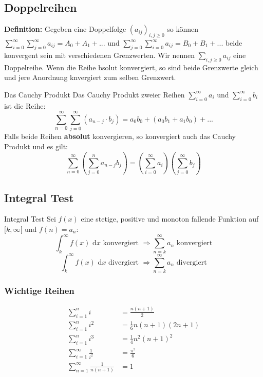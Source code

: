 \documentclass[a4paper,8pt]{extarticle}
\newenvironment{definition}{
   \noindent \textbf{Definition:  }}{}
\def\dx{\text{ d}x}
\begin{document}
\subsection{Doppelreihen}

\begin{definition}
  Gegeben eine Doppelfolge $(a_{ij})_{i,j \geq 0}$ so können \\ $\sum_{i=0}^\infty \sum_{j=0}^\infty a_{ij} = A_0 + A_1 + ...$ und $\sum_{j=0}^\infty \sum_{i=0}^\infty a_{ij} = B_0 + B_1 + ...$ beide konvergent sein mit verschiedenen Grenzwerten. Wir nennen $\sum_{i, j \geq 0} a_{ij}$ eine Doppelreihe. Wenn die Reihe bsolut konvergiert, so sind beide Grenzwerte gleich und jere Anordnung knvergiert zum selben Grenzwert.
\end{definition}

\begin{mainbox}{Das Cauchy Produkt}
  Das Cauchy Produkt zweier Reihen $\sum_{i=0}^{\infty} a_i$ und $\sum_{i=0}^{\infty} b_i$ ist die Reihe: 
  $$\sum_{n=0}^{\infty} \sum_{j=0}^\infty (a_{n-j} \cdot b_j) = a_0 b_0 + (a_0 b_1 + a_1 b_0) + ...$$
  Falls beide Reihen \textbf{absolut} konvergieren, so konvergiert auch das Cauchy Produkt und es gilt:
  $$\sum_{n=0}^\infty \left(\sum_{j=0}^n a_{n-j}b_j\right) = \left(\sum_{i=0}^\infty a_i\right) \left(\sum_{j=0}^\infty b_j\right)$$
\end{mainbox}

\subsection{Integral Test}
\begin{mainbox}{Integral Test}
  Sei $f(x)$ eine stetige, positive und monoton fallende Funktion auf $[k, \infty[$ und $f(n) = a_n$:
  $$\int_k^\infty f(x)\dx \text{ konvergiert } \Rightarrow \sum_{n = k}^\infty a_n \text{ konvergiert}$$$$\int_k^\infty f(x)\dx \text{ divergiert } \Rightarrow \sum_{n = k}^\infty a_n \text{ divergiert}$$
\end{mainbox}

\subsubsection{Wichtige Reihen}
\begin{align*}
 \sum_{i=1}^n i &= \frac{n(n+1)}{2} \\
 \sum_{i=1}^n i^2 &= \frac{1}{6}n(n+1)(2n+1) \\
 \sum_{i=1}^n i^3 &= \frac{1}{4}n^2(n+1)^2 \\
 \sum_{i=1}^\infty \frac{1}{i^2} &= \frac{\pi^2}{6} \\
 \sum_{n=1}^\infty \frac{1}{n(n+1)} &= 1
\end{align*}
\end{document}
